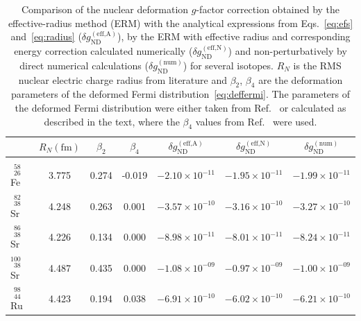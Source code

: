 \begin{table}
\begin{minipage}{1.1\textwidth}
\caption{\label{tab:spline}%
Comparison of the nuclear deformation $g$-factor correction obtained by the effective-radius method (ERM) with the analytical expressions from Eqs.~\eqref{eq:efs} and~\eqref{eq:radius} ($\delta g_{\text{ND}}^{(\text{eff,A})}$), by the ERM with effective radius and corresponding energy correction calculated numerically ($\delta g_{\text{ND}}^{(\text{eff,N})}$) and non-perturbatively by direct numerical calculations ($\delta g_{\text{ND}}^{(\text{num})}$) for several isotopes. $R_N$ is the RMS nuclear electric charge radius from literature \cite{Angeli2013} and $\beta_2$, $\beta_4$ are the deformation parameters of the deformed Fermi distribution~\eqref{eq:deffermi}. The parameters of the deformed Fermi distribution were either taken from Ref.~\cite{jacek2012} or calculated as described in the text, where the $\beta_4$ values from Ref.~\cite{Moller1995} were used.
}
\centering
\renewcommand*{\thefootnote}{\alph{footnote}}
\begin{tabular}{lcccccc}
 & \multicolumn{1}{c}{$R{\scriptstyle _N(\text{fm})}$} & \multicolumn{1}{c}{$\beta_2$} & \multicolumn{1}{c}{$\beta_4$} & \multicolumn{1}{c}{$\delta g_{\text{ND}}^{(\text{eff,A})}$} & \multicolumn{1}{c}{$\delta g_{\text{ND}}^{(\text{eff,N})}$} & \multicolumn{1}{c}{$\delta g_{\text{ND}}^{(\text{num})}$}\\
\hline\\[-5pt]
$^{\phantom{0}58}_{\phantom{0}26}$Fe$\;$\footnotemark[1] & 3.775 & 0.274                 & -0.019        & $-2.10\times 10^{-11}$ & $-1.95\times 10^{-11}$ & $-1.99\times 10^{-11}$ \\[4pt]
$^{\phantom{0}82}_{\phantom{0}38}$Sr$\;$\footnotemark[1] & 4.248 & 0.263                 & 0.001         & $-3.57\times 10^{-10}$ & $-3.16\times 10^{-10}$ & $-3.27\times 10^{-10}$ \\[4pt]
$^{\phantom{0}86}_{\phantom{0}38}$Sr$\;$\footnotemark[2] & 4.226 & 0.134\footnotemark[3] & 0.000         & $-8.98\times 10^{-11}$ & $-8.01\times 10^{-11}$ & $-8.24\times 10^{-11}$ \\[4pt]
$^{100}_{\phantom{0}38}$Sr$\;$\footnotemark[2]           & 4.487 & 0.435\footnotemark[3] & 0.000         & $-1.08\times 10^{-09}$ & $-0.97\times 10^{-09}$ & $-1.00\times 10^{-09}$ \\[4pt]
$^{\phantom{0}98}_{\phantom{0}44}$Ru$\;$\footnotemark[1] & 4.423 & 0.194                 & 0.038         & $-6.91\times 10^{-10}$ & $-6.02\times 10^{-10}$ & $-6.21\times 10^{-10}$ \\[4pt]

\end{tabular}
\end{minipage}
\end{table}
